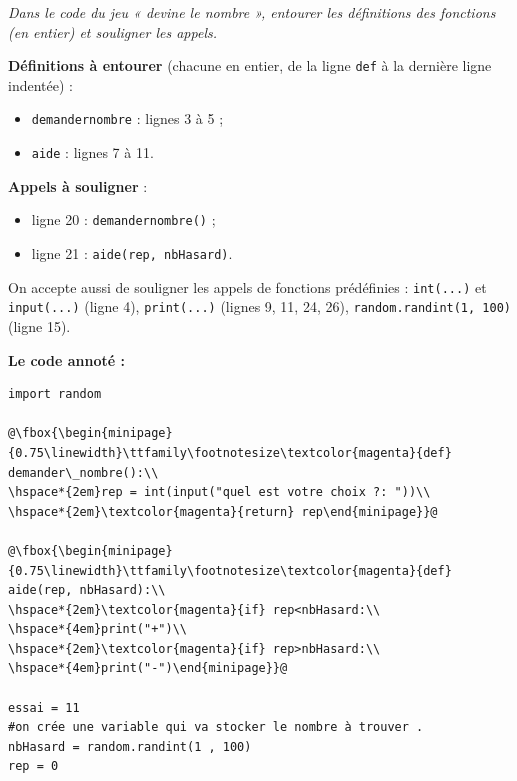 \documentclass[addpoints, 11pt]{exam}
\newcommand{\enonce}[1]{\textit{#1}\par\smallskip}
\newcommand{\code}[1]{\texttt{#1}}
\DeclareRobustCommand{\_}{\textunderscore\allowbreak}
\begin{document}
\begin{questions}
\question[3] \enonce{Dans le code du jeu « devine le nombre », entourer les définitions des fonctions (en entier) et souligner les appels.}
\begin{reponse}
\textbf{Définitions à entourer} (chacune en entier, de la ligne \code{def} à la dernière ligne indentée) :
\begin{itemize}
  \item \code{demander\_nombre} : lignes 3 à 5 ;
  \item \code{aide} : lignes 7 à 11.
\end{itemize}
\textbf{Appels à souligner} :
\begin{itemize}
  \item ligne 20 : \code{demander\_nombre()} ;
  \item ligne 21 : \code{aide(rep, nbHasard)}.
\end{itemize}
On accepte aussi de souligner les appels de fonctions prédéfinies : \code{int(...)} et \code{input(...)} (ligne 4), \code{print(...)} (lignes 9, 11, 24, 26), \code{random.randint(1, 100)} (ligne 15).
\end{reponse}
\textbf{Le code annoté :}
\begin{lstlisting}[escapechar=@, numbers=none]
import random

@\fbox{\begin{minipage}{0.75\linewidth}\ttfamily\footnotesize\textcolor{magenta}{def} demander\_nombre():\\
\hspace*{2em}rep = int(input("quel est votre choix ?: "))\\
\hspace*{2em}\textcolor{magenta}{return} rep\end{minipage}}@

@\fbox{\begin{minipage}{0.75\linewidth}\ttfamily\footnotesize\textcolor{magenta}{def} aide(rep, nbHasard):\\
\hspace*{2em}\textcolor{magenta}{if} rep<nbHasard:\\
\hspace*{4em}print("+")\\
\hspace*{2em}\textcolor{magenta}{if} rep>nbHasard:\\
\hspace*{4em}print("-")\end{minipage}}@

essai = 11
#on crée une variable qui va stocker le nombre à trouver .
nbHasard = random.randint(1 , 100)
rep = 0


\end{lstlisting}
\end{questions}
\end{document}
